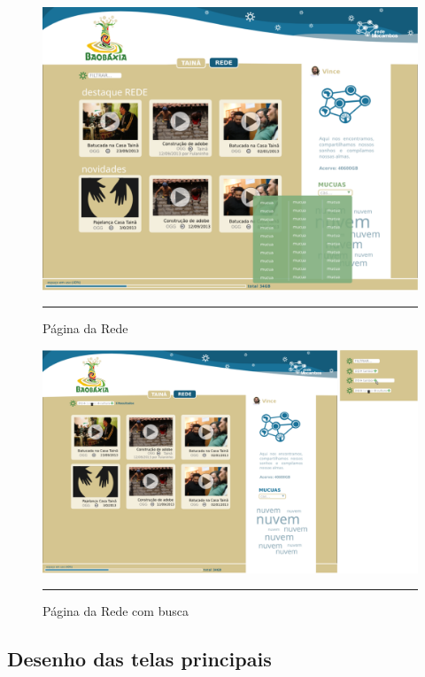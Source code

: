 \begin{figure}[htbp]
  \centering
  \includegraphics[width=\textwidth]{./Fig/layout-pgREDE.pdf}
  \rule{35em}{0.5pt}
  \caption[Página da Rede]{Página da Rede}
  \label{fig:layout-pgREDE}
\end{figure}

\begin{figure}[htbp]
  \centering
  \includegraphics[width=\textwidth]{./Fig/layout-pgREDEbusca.pdf}
  \rule{35em}{0.5pt}
  \caption[Página da Rede com busca]{Página da Rede com busca}
  \label{fig:layout-pgREDEbusca}
\end{figure}

\subsection{Desenho das telas principais}

